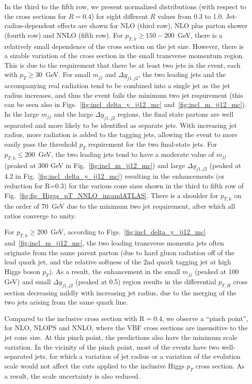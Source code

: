 \documentclass[10pt,prd,fleqn,superscriptaddress,notitlepage,nofootinbib,preprintnumbers,nobalancelastpage]{revtex4-1}
\newcommand{\VBF}{VBF\xspace}
\begin{document}
In the third to the fifth row, we present  normalized distributions (with respect to the cross sections for $R=0.4$) for eight different $R$ values from 0.3 to 1.0.  Jet-radius-dependent effects are shown for NLO (third row), NLO plus parton shower (fourth row) and NNLO (fifth row). For $p_{T,h}\ge 150-200$~GeV, there is a relatively small dependence of the cross section on the jet size. However, there is a sizable variation of the cross section in the small transverse momentum region. This is due to the requirement that there be at least two jets  in the event, each with $p_T \ge 30$~GeV.
For small $m_{jj}$ and  $\Delta  y_{j1,j2}$, the two leading jets and the accompanying real radiation tend to be combined into a single jet as the jet radius increases, and thus the event fails the minimum two jet requirement (this can be seen also in Figs.~\ref{fig:incl_delta_y_jj12_mc} and~\ref{fig:incl_m_jj12_mc}). In the large $m_{jj}$ and the large $\Delta y_{j1,j2}$ regions, the final state partons are well separated and more likely to be identified as separate jets.
With increasing jet radius, more radiation is added to the tagging jets, allowing the event to more easily pass the threshold $p_T$ requirement for the two final-state jets.
For $p_{T,h}\le 200$~GeV, the two leading jets tend to have
a moderate value of  $m_{jj}$ (peaked at 300 GeV in Fig.~\ref{fig:incl_m_jj12_mc}) and large $\Delta  y_{j1,j2}$ (peaked at 4.2 in Fig.~\ref{fig:incl_delta_y_jj12_mc}) resulting in the enhancements (or reduction for R=0.3) for the various cone sizes shown in the third to fifth row of Fig.~\ref{fig:fig_Higgs_pT_NNLO_incandATLAS}.
There is a shoulder for $p_{T,h}$ on the order of 70~GeV due to the minimum two jet requirement, after which all ratios converge to unity.

For $p_{T,h}\ge 200$~GeV, according to Figs.~\ref{fig:incl_delta_y_jj12_mc} and~\ref{fig:incl_m_jj12_mc}, the two leading  transverse momenta jets often originate from the same parent parton (due to hard gluon radiation off of the lead quark jet, and the relative softness of the 2nd quark tagging jet at high Higgs boson $p_T$).  As a result, the enhancement in the small $m_{jj}$ (peaked at 100 GeV) and small $\Delta y_{j1,j2}$ (peaked at 0.5) region results in the  differential $p_{T,H}$ cross section  decreasing mildly with increasing jet radius, due to the merging of the two jets arising from the same quark line.

Compared to the inclusive cross section with R$=0.4$, we observe a ``pinch point'', for NLO, NLOPS and NNLO, where the \VBF cross sections are insensitive to the  jet cone size. At this pinch point,  the predictions also have the minimum scale variation. In the vicinity of the pinch point, most of the events have two well-separated jets, for which a  variation of jet radius or a variation of the evolution scale would not affect the cuts applied to the inclusive Higgs $p_T$ cross section.
As a result,
the scale uncertainty is also reduced.
\end{document}
